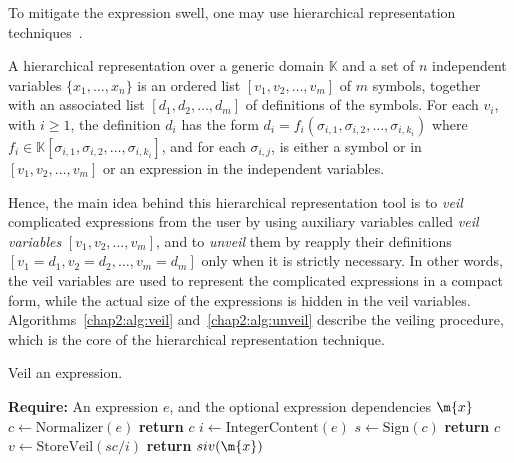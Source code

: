To mitigate the expression swell, one may use hierarchical representation techniques~\cite{carette2006linear, zhou2006hierarchical}.
%
\begin{definition}
  A hierarchical representation over a generic domain $\mathbb{K}$ and a set of $n$ independent variables $\{x_1, \dots, x_n\}$ is an ordered list $[v_1, v_2, \dots, v_m]$ of $m$ symbols, together with an associated list $[d_1, d_2, \dots, d_m]$ of definitions of the symbols. For each $v_i$, with $i \geq 1$, the definition $d_i$ has the form $d_i = f_i(\sigma_{i,1}, \sigma_{i,2}, \dots, \sigma_{i,k_i})$ where $f_i \in \mathbb{K}[\sigma_{i,1}, \sigma_{i,2}, \dots, \sigma_{i,k_i}]$, and for each $\sigma_{i,j}$, is either a symbol or in $[v_1, v_2, \dots, v_m]$ or an expression in the independent variables.
\end{definition}
%
Hence, the main idea behind this hierarchical representation tool is to \emph{veil} complicated expressions from the user by using auxiliary variables called \emph{veil variables} $[v_1, v_2, \dots, v_m]$, and to \emph{unveil} them by reapply their definitions $[v_1 = d_1, v_2 = d_2, \dots, v_m = d_m]$ only when it is strictly necessary. In other words, the veil variables are used to represent the complicated expressions in a compact form, while the actual size of the expressions is hidden in the veil variables. Algorithms~\ref{chap2:alg:veil} and~\ref{chap2:alg:unveil} describe the veiling procedure, which is the core of the hierarchical representation technique.

\begin{breakablealgorithm}
  \caption{Veil an expression.}
  \label{chap2:alg:veil}
  \begin{algorithmic}[1]
    \State \textbf{Require:} An expression $e$, and the optional expression dependencies $\m{x}$
     
    \State $c \gets \mathrm{Normalizer}(e)$ 
     
      \State \textbf{return} $c$ 
    \EndIf
    \State $i \gets \mathrm{IntegerContent}(e)$ 
    \State $s \gets \mathrm{Sign}(c)$ 
     
      \State \textbf{return} $c$ 
    \Else
      \State $v \gets \mathrm{StoreVeil}(sc/i)$ 
      \State \textbf{return} $siv(\m{x})$ 
    \EndIf
    \EndProcedure
  \end{algorithmic}
\end{breakablealgorithm}

